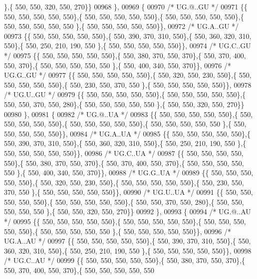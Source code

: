 \begin{DoxyCode}
      \},\{ 550, 550, 320, 550, 270\}\}
00968 \},
00969 \{
00970 \textcolor{comment}{/* UG.@..GU */}
00971 \{\{ 550, 550, 550, 550, 550\},\{ 550, 550, 550, 550, 550\},\{ 550, 550, 550, 550, 550\},\{ 550, 550, 550, 550, 550
      \},\{ 550, 550, 550, 550, 550\}\},
00972 \textcolor{comment}{/* UG.A..GU */}
00973 \{\{ 550, 550, 550, 550, 550\},\{ 550, 390, 370, 310, 550\},\{ 550, 360, 320, 310, 550\},\{ 550, 250, 210, 190, 550
      \},\{ 550, 550, 550, 550, 550\}\},
00974 \textcolor{comment}{/* UG.C..GU */}
00975 \{\{ 550, 550, 550, 550, 550\},\{ 550, 380, 370, 550, 370\},\{ 550, 370, 400, 550, 370\},\{ 550, 550, 550, 550, 550
      \},\{ 550, 400, 340, 550, 370\}\},
00976 \textcolor{comment}{/* UG.G..GU */}
00977 \{\{ 550, 550, 550, 550, 550\},\{ 550, 320, 550, 230, 550\},\{ 550, 550, 550, 550, 550\},\{ 550, 230, 550, 370, 550
      \},\{ 550, 550, 550, 550, 550\}\},
00978 \textcolor{comment}{/* UG.U..GU */}
00979 \{\{ 550, 550, 550, 550, 550\},\{ 550, 550, 550, 550, 550\},\{ 550, 550, 370, 550, 280\},\{ 550, 550, 550, 550, 550
      \},\{ 550, 550, 320, 550, 270\}\}
00980 \},
00981 \{
00982 \textcolor{comment}{/* UG.@..UA */}
00983 \{\{ 550, 550, 550, 550, 550\},\{ 550, 550, 550, 550, 550\},\{ 550, 550, 550, 550, 550\},\{ 550, 550, 550, 550, 550
      \},\{ 550, 550, 550, 550, 550\}\},
00984 \textcolor{comment}{/* UG.A..UA */}
00985 \{\{ 550, 550, 550, 550, 550\},\{ 550, 390, 370, 310, 550\},\{ 550, 360, 320, 310, 550\},\{ 550, 250, 210, 190, 550
      \},\{ 550, 550, 550, 550, 550\}\},
00986 \textcolor{comment}{/* UG.C..UA */}
00987 \{\{ 550, 550, 550, 550, 550\},\{ 550, 380, 370, 550, 370\},\{ 550, 370, 400, 550, 370\},\{ 550, 550, 550, 550, 550
      \},\{ 550, 400, 340, 550, 370\}\},
00988 \textcolor{comment}{/* UG.G..UA */}
00989 \{\{ 550, 550, 550, 550, 550\},\{ 550, 320, 550, 230, 550\},\{ 550, 550, 550, 550, 550\},\{ 550, 230, 550, 370, 550
      \},\{ 550, 550, 550, 550, 550\}\},
00990 \textcolor{comment}{/* UG.U..UA */}
00991 \{\{ 550, 550, 550, 550, 550\},\{ 550, 550, 550, 550, 550\},\{ 550, 550, 370, 550, 280\},\{ 550, 550, 550, 550, 550
      \},\{ 550, 550, 320, 550, 270\}\}
00992 \},
00993 \{
00994 \textcolor{comment}{/* UG.@..AU */}
00995 \{\{ 550, 550, 550, 550, 550\},\{ 550, 550, 550, 550, 550\},\{ 550, 550, 550, 550, 550\},\{ 550, 550, 550, 550, 550
      \},\{ 550, 550, 550, 550, 550\}\},
00996 \textcolor{comment}{/* UG.A..AU */}
00997 \{\{ 550, 550, 550, 550, 550\},\{ 550, 390, 370, 310, 550\},\{ 550, 360, 320, 310, 550\},\{ 550, 250, 210, 190, 550
      \},\{ 550, 550, 550, 550, 550\}\},
00998 \textcolor{comment}{/* UG.C..AU */}
00999 \{\{ 550, 550, 550, 550, 550\},\{ 550, 380, 370, 550, 370\},\{ 550, 370, 400, 550, 370\},\{ 550, 550, 550, 550, 550

\end{DoxyCode}
